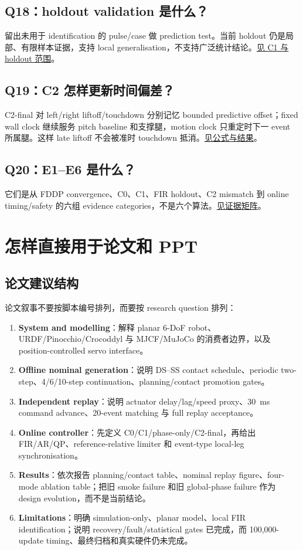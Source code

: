 \documentclass[UTF8,11pt,a4paper]{ctexart}
\begin{document}
\subsection{Q18：holdout validation 是什么？}\label{q18}
留出未用于 identification 的 pulse/case 做 prediction test。当前 holdout 仍是局部、有限样本证据，支持 local generalisation，不支持广泛统计结论。\hyperref[sec:balanced]{见 C1 与 holdout 范围}。

\subsection{Q19：C2 怎样更新时间偏差？}\label{q19}
C2-final 对 left/right liftoff/touchdown 分别记忆 bounded predictive offset；fixed wall clock 继续服务 pitch baseline 和支撑腿，motion clock 只重定时下一 event 所属腿。这样 late liftoff 不会被准时 touchdown 抵消。\hyperref[sec:c2]{见公式与结果}。

\subsection{Q20：E1--E6 是什么？}\label{q20}
它们是从 FDDP convergence、C0、C1、FIR holdout、C2 mismatch 到 online timing/safety 的六组 evidence categories，不是六个算法。\hyperref[sec:evidence]{见证据矩阵}。

\section{怎样直接用于论文和 PPT}\label{sec:writing_ppt}

\subsection{论文建议结构}

论文叙事不要按脚本编号排列，而要按 research question 排列：
\begin{enumerate}
 \item \textbf{System and modelling}：解释 planar 6-DoF robot、URDF/Pinocchio/Crocoddyl 与 MJCF/MuJoCo 的消费者边界，以及 position-controlled servo interface。
 \item \textbf{Offline nominal generation}：说明 DS--SS contact schedule、periodic two-step、4/6/10-step continuation、planning/contact promotion gates。
 \item \textbf{Independent replay}：说明 actuator delay/lag/speed proxy、\SI{30}{ms} command advance、20-event matching 与 full replay acceptance。
 \item \textbf{Online controller}：先定义 C0/C1/phase-only/C2-final，再给出 FIR/AR/QP、reference-relative limiter 和 event-type local-leg synchronisation。
 \item \textbf{Results}：依次报告 planning/contact table、nominal replay figure、four-mode ablation table；把旧 smoke failure 和旧 global-phase failure 作为 design evolution，而不是当前结论。
 \item \textbf{Limitations}：明确 simulation-only、planar model、local FIR identification；说明 recovery/fault/statistical gates 已完成，而 100,000-update timing、最终归档和真实硬件仍未完成。
\end{enumerate}
\end{document}
